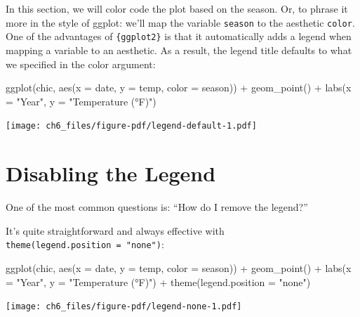 \documentclass[
  letterpaper,
  DIV=11,
  numbers=noendperiod]{scrreprt}
\newenvironment{Shaded}{\begin{snugshade}}{\end{snugshade}}
\newcommand{\AttributeTok}[1]{\textcolor[rgb]{0.40,0.45,0.13}{#1}}
\newcommand{\FunctionTok}[1]{\textcolor[rgb]{0.28,0.35,0.67}{#1}}
\newcommand{\NormalTok}[1]{\textcolor[rgb]{0.00,0.23,0.31}{#1}}
\newcommand{\SpecialCharTok}[1]{\textcolor[rgb]{0.37,0.37,0.37}{#1}}
\newcommand{\StringTok}[1]{\textcolor[rgb]{0.13,0.47,0.30}{#1}}
\begin{document}
In this section, we will color code the plot based on the season. Or, to
phrase it more in the style of ggplot: we'll map the variable
\texttt{season} to the aesthetic \texttt{color}. One of the advantages
of \texttt{\{ggplot2\}} is that it automatically adds a legend when
mapping a variable to an aesthetic. As a result, the legend title
defaults to what we specified in the color argument:

\begin{Shaded}
\begin{Highlighting}[]
\FunctionTok{ggplot}\NormalTok{(chic,}
       \FunctionTok{aes}\NormalTok{(}\AttributeTok{x =}\NormalTok{ date, }\AttributeTok{y =}\NormalTok{ temp, }\AttributeTok{color =}\NormalTok{ season)) }\SpecialCharTok{+}
  \FunctionTok{geom\_point}\NormalTok{() }\SpecialCharTok{+}
  \FunctionTok{labs}\NormalTok{(}\AttributeTok{x =} \StringTok{"Year"}\NormalTok{, }\AttributeTok{y =} \StringTok{"Temperature (°F)"}\NormalTok{)}
\end{Highlighting}
\end{Shaded}

\texttt{[image: ch6\_files/figure-pdf/legend-default-1.pdf]}

\section{Disabling the Legend}\label{disabling-the-legend}

One of the most common questions is: ``How do I remove the legend?''

It's quite straightforward and always effective with
\texttt{theme(legend.position\ =\ "none")}:

\begin{Shaded}
\begin{Highlighting}[]
\FunctionTok{ggplot}\NormalTok{(chic,}
       \FunctionTok{aes}\NormalTok{(}\AttributeTok{x =}\NormalTok{ date, }\AttributeTok{y =}\NormalTok{ temp, }\AttributeTok{color =}\NormalTok{ season)) }\SpecialCharTok{+}
  \FunctionTok{geom\_point}\NormalTok{() }\SpecialCharTok{+}
  \FunctionTok{labs}\NormalTok{(}\AttributeTok{x =} \StringTok{"Year"}\NormalTok{, }\AttributeTok{y =} \StringTok{"Temperature (°F)"}\NormalTok{) }\SpecialCharTok{+}
  \FunctionTok{theme}\NormalTok{(}\AttributeTok{legend.position =} \StringTok{"none"}\NormalTok{)}
\end{Highlighting}
\end{Shaded}

\texttt{[image: ch6\_files/figure-pdf/legend-none-1.pdf]}
\end{document}
